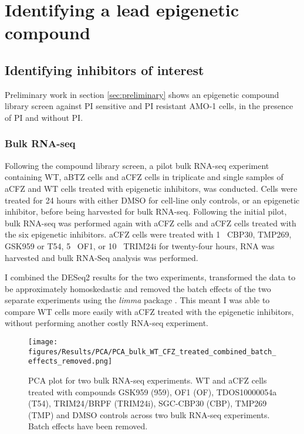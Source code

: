 \chapter{\label{ch:5-results}Identifying a lead epigenetic compound}

\section{Identifying inhibitors of interest}
Preliminary work in section \ref{sec:preliminary} shows an epigenetic compound library screen against PI sensitive and PI resistant AMO-1 cells, in the presence of PI and without PI\@.

\subsection{Bulk RNA-seq}
Following the compound library screen, a pilot bulk RNA-seq experiment containing WT, aBTZ cells and aCFZ cells in triplicate and single samples of aCFZ and WT cells treated with epigenetic inhibitors, was conducted.
Cells were treated for 24 hours with either DMSO for cell-line only controls, or an epigenetic inhibitor, before being harvested for bulk RNA-seq.
Following the initial pilot, bulk RNA-seq was performed again with aCFZ cells and aCFZ cells treated with the six epigenetic inhibitors.
aCFZ cells were treated with 1\si{\micro\Molar} CBP30, TMP269, GSK959 or T54, 5\si{\micro\Molar} OF1, or 10\si{\micro\Molar} TRIM24i for twenty-four hours, RNA was harvested and bulk RNA-Seq analysis was performed.


I combined the DESeq2 \cite{love2014moderated} results for the two experiments, transformed the data to be approximately homoskedastic and removed the batch effects of the two separate experiments using the \textit{limma} package \cite{smyth2005limma}.
This meant I was able to compare WT cells more easily with aCFZ treated with the epigenetic inhibitors, without performing another costly RNA-seq experiment.

\begin{figure}[htb]
\centering
\texttt{[image: figures/Results/PCA/PCA\_bulk\_WT\_CFZ\_treated\_combined\_batch\_effects\_removed.png]}
\caption[Bulk RNA-Seq WT and aCFZ cells epigenetic treated PCA]{PCA plot for two bulk RNA-seq experiments.
WT and aCFZ cells treated with compounds GSK959 (959), OF1 (OF), TDOS10000054a (T54), TRIM24/BRPF (TRIM24i), SGC-CBP30 (CBP), TMP269 (TMP) and DMSO controls across two bulk RNA-seq experiments.
Batch effects have been removed.}
\label{fig:bulk_wt_cfz_epi_treated_pca}
\end{figure}

